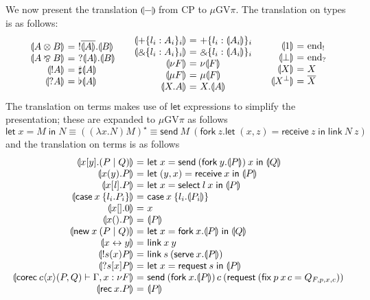 \documentclass[orivec,envcountsame]{llncs}
\makeatletter
\newcommand{\with}{\mathbin\binampersand}
\newcommand{\parr}{\mathbin\bindnasrepma}
\newcommand{\cpdual}[1]{#1^\perp}
\newcommand{\cpbang}[1]{{! #1}}
\newcommand{\cpquery}[1]{{? #1}}
\newcommand{\gvdual}[1]{\overline{#1}}
\newcommand{\gvout}[2]{{!#1.#2}}
\newcommand{\gvin}[2]{{?#1.#2}}
\newcommand{\outterm}{\mathrm{end}_!}
\newcommand{\interm}{\mathrm{end}_?}
\newcommand{\gvserver}[1]{\flat #1}
\newcommand{\gvservice}[1]{\sharp #1}
\newcommand{\cptyp}[2]{#1 \vdash #2}
\newcommand{\mkwd}[1]{\mathsf{#1}}
\newcommand{\link}[2]{#1 \leftrightarrow #2}
\newcommand{\cut}[4]{\mkwd{new}\:#1 \: (#3 \mid #4)}
\newcommand{\replicate}[2]{{!#1(#2)}}
\newcommand{\derelict}[2]{{?#1[#2]}}
\newcommand{\rec}[1]{\mkwd{rec}\:#1}
\newcommand{\corec}[5]{\mkwd{corec}\:#1 \langle #2 \rangle (#4,#5)}
\newcommand{\clabel}[1]{\mathrm{#1}}
\renewcommand{\case}[2]{\mkwd{case}\:#1\:\{#2\}}
\newcommand{\sel}[2]{#1[\clabel{#2}]}
\newcommand{\gvsend}[2]{\mkwd{send}\:#1\:#2}
\newcommand{\gvreceive}[1]{\mkwd{receive}\:#1}
\newcommand{\gvlet}[3]{\mkwd{let}\;#1 = #2\;\mkwd{in}\;#3}
\newcommand{\gvselect}[2]{\mkwd{select}\:#1\:#2}
\newcommand{\gvcase}[2]{\mkwd{case}\:#1\:\{#2\}}
\newcommand{\gvlink}[2]{\mkwd{link}\:#1\:#2}
\newcommand{\gvfork}[2]{\mkwd{fork}\:#1.#2}
\newcommand{\lrkwd}{\mkwd{fix}}
\newcommand{\gvfix}[3]{\lrkwd\:#1\:#2 = #3}
\newcommand{\gvserve}[2]{\mkwd{serve}\:#1.#2}
\newcommand{\gvrequest}[1]{\mkwd{request}\:#1}
\newcommand{\gvreceivek}[4]{\gvlet{({#1}, {#2})}{\gvreceive{#3}}{#4}}
\newcommand{\key}{\mkwd}
\newcommand{\togv}[1]{\llparenthesis #1 \rrparenthesis}
\newcommand{\topi}[1]{({#1})^\star}
\newcommand{\gvpi}{$\mu\mathrm{GV}\pi$\xspace}
\newcommand{\ba}{\begin{array}}
\newcommand{\ea}{\end{array}}
\newenvironment{equations}{\[\ba{@{}r@{~}c@{~}l@{}}}{\ea\]}
\newenvironment{eqs}{\ba{@{}r@{~}c@{~}l@{}}}{\ea}
\makeatother
\begin{document}
We now present the translation $\togv{-}$ from CP to \gvpi. The translation on types is as follows:
\[
\ba{@{}c@{\qquad}c@{\qquad}c@{}}
\begin{eqs}
\togv{A \otimes B} &=& \gvout{\gvdual{\togv{A}}}{\togv{B}} \\
\togv{A \parr B}   &=& \gvin{\togv{A}}{\togv{B}} \\
\togv{\cpbang{A}}   &=& \gvservice{\togv{A}} \\
\togv{\cpquery{A}}  &=& \gvserver{\togv{A}} \\
\end{eqs}
&
\begin{eqs}
\togv{+\{l_i:A_i\}_i}     &=& +\{l_i:\togv{A_i}\}_i  \\
\togv{\with\{l_i:A_i\}_i} &=& \with\{l_i:\togv{A_i}\}_i \\
\togv{\nu F} &=& \nu \togv{F} \\
\togv{\mu F} &=& \mu \togv{F} \\
\togv{X.A} &=& X.\togv{A} \\
\end{eqs}
&
\begin{eqs}
\togv{1}           &=& \outterm \\
\togv{\bot}              &=& \interm \\
\togv{X}            &=& X \\
\togv{\cpdual{X}}   &=& \gvdual{X} \\
\end{eqs}
\ea
\]
The translation on terms makes use of $\key{let}$ expressions to simplify the presentation; these
are expanded to \gvpi as follows
\[
\gvlet{x}{M}{N} \equiv
  \topi{(\lambda x.N) M} \equiv
  \gvsend{M}{(\gvfork{z}{\gvreceivek{x}{z}{z}{\gvlink{N}{z}}})}
\]%
and the translation on terms is as follows
\begin{equations}
  \togv{x[y].(P \mid Q)} &=&
    \gvlet{x}{\gvsend{(\gvfork{y}{\togv{P}})}{x}}{\togv{Q}} \\
  \togv{x(y).P} &=&
    \gvlet{(y,x)}{\gvreceive{x}}{\togv{P}} \\
  \togv{\sel{x}{\mathit{l}}.P} &=&
    \gvlet{x}{\gvselect{l}{x}}{\togv{P}} \\
  \togv{\case{x}{l_i.P_i}} &=&
    \gvcase{x}{l_i.\togv{P_i}} \\
  \togv{x[].0} &=& x \\
  \togv{x().P} &=& \togv{P} \\
  \togv{\cut{x}{}{P}{Q}} &=&
    \gvlet{x}{\gvfork{x}{\togv{P}}}{\togv{Q}} \\
  \togv{\link{x}{y}} &=& \gvlink{x}{y} \\
  \togv{\replicate{s}{x}{P}} &=&
    \gvlink{s}{(\gvserve{x}{\togv{P}})} \\
  \togv{\derelict{s}{x}{P}} &=&
    \gvlet{x}{\gvrequest{s}}{\togv{P}} \\
  \togv{\cptyp{\corec{c}{x}{}{P}{Q}}{\Gamma, x:\nu F}} &=&
    \gvsend{(\gvfork{x}{\togv{P}})\,c}{(\gvrequest{(\gvfix{p}{x\,c}{Q_{F,p,x,c}})})} \\
  \togv{\rec{x}.P} &=& \togv{P} \\
\end{equations}%
\end{document}

